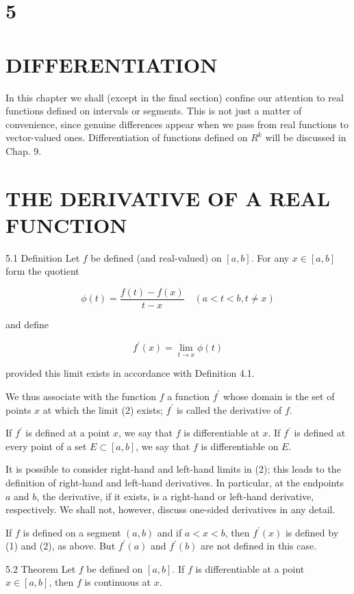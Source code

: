 \documentclass[10pt]{article}
\begin{document}
\section{5}
\section{DIFFERENTIATION}
In this chapter we shall (except in the final section) confine our attention to real functions defined on intervals or segments. This is not just a matter of convenience, since genuine differences appear when we pass from real functions to vector-valued ones. Differentiation of functions defined on $R^{k}$ will be discussed in Chap. 9.

\section{THE DERIVATIVE OF A REAL FUNCTION}
5.1 Definition Let $f$ be defined (and real-valued) on $[a, b]$. For any $x \in[a, b]$ form the quotient

$$
\phi(t)=\frac{f(t)-f(x)}{t-x} \quad(a<t<b, t \neq x)
$$

and define

$$
f^{\prime}(x)=\lim _{t \rightarrow x} \phi(t)
$$

provided this limit exists in accordance with Definition 4.1.

We thus associate with the function $f$ a function $f^{\prime}$ whose domain is the set of points $x$ at which the limit (2) exists; $f^{\prime}$ is called the derivative of $f$.

If $f^{\prime}$ is defined at a point $x$, we say that $f$ is differentiable at $x$. If $f^{\prime}$ is defined at every point of a set $E \subset[a, b]$, we say that $f$ is differentiable on $E$.

It is possible to consider right-hand and left-hand limits in (2); this leads to the definition of right-hand and left-hand derivatives. In particular, at the endpoints $a$ and $b$, the derivative, if it exists, is a right-hand or left-hand derivative, respectively. We shall not, however, discuss one-sided derivatives in any detail.

If $f$ is defined on a segment $(a, b)$ and if $a<x<b$, then $f^{\prime}(x)$ is defined by (1) and (2), as above. But $f^{\prime}(a)$ and $f^{\prime}(b)$ are not defined in this case.

5.2 Theorem Let $f$ be defined on $[a, b]$. If $f$ is differentiable at a point $x \in[a, b]$, then $f$ is continuous at $x$.
\end{document}
